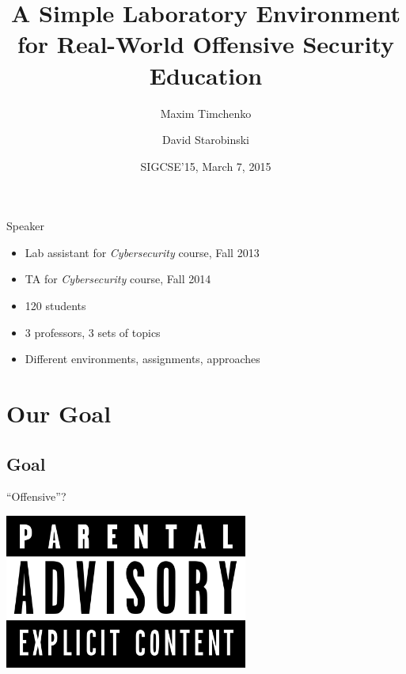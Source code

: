 \documentclass{beamer}
\title{A Simple Laboratory Environment \\for Real-World Offensive Security Education}
\author{Maxim Timchenko \and David Starobinski}
\institute{Electrical and Computer Engineering Department\\Boston University}
\date{SIGCSE'15, March 7, 2015}
\begin{document}
	\begin{frame}
		\titlepage
	\end{frame}
	
	\begin{frame}{Speaker}
		\begin{itemize}
			\item Lab assistant for \emph{Cybersecurity} course, Fall 2013
			\item TA for \emph{Cybersecurity} course, Fall 2014
			\item 120 students
			\item 3 professors, 3 sets of topics
			\item Different environments, assignments, approaches
		\end{itemize}
	\end{frame}
	
	\begin{frame}
		\titlepage
	\end{frame}
	
	\section{Our Goal}
	\subsection{Goal}
	\begin{frame}{``Offensive''?}
		\begin{center}
			\includegraphics[width=0.6\textwidth]{parental-advisory-wikipedia.png}
		\end{center}
	\end{frame}
	
\end{document}
